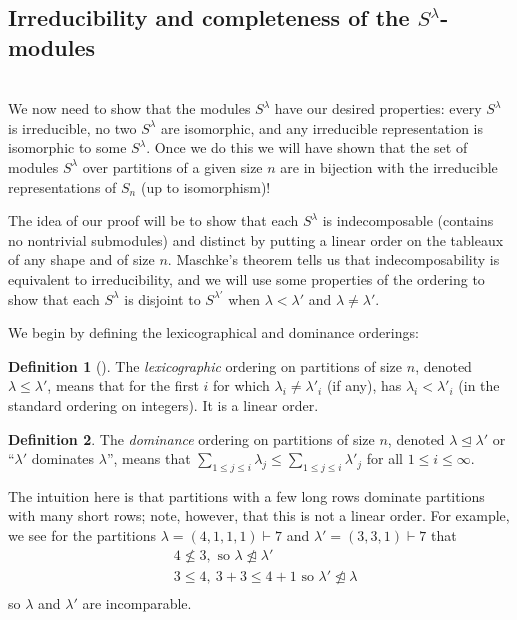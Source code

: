 \documentclass[12pt,twoside]{reedthesis}
\theoremstyle{plain}   %
\theoremstyle{definition}
\newtheorem{defn}{Definition}[section]
\theoremstyle{remark}
\numberwithin{equation}{section}
\def\normeq{\trianglelefteq}
\begin{document}
  \subsection{Irreducibility and completeness of the $S^\lambda$-modules} \hfill\\
  We now need to show that the modules $S^\lambda$ have our desired properties: every $S^\lambda$ is irreducible, no two $S^\lambda$ are isomorphic,
  and any irreducible representation is isomorphic to some $S^\lambda$. Once we do this we will have shown that the set of modules $S^\lambda$
  over partitions of a given size $n$
  are in bijection with the irreducible representations of $S_n$ (up to isomorphism)! \par
  The idea of our proof will be to show that each $S^\lambda$ is indecomposable (contains no nontrivial submodules)
  and distinct by putting a linear order on the tableaux of any shape
  and of size $n$. Maschke's theorem tells us that indecomposability is equivalent to irreducibility, and we will use some properties of the ordering
  to show that each $S^\lambda$ is disjoint to $S^{\lambda'}$ when $\lambda < \lambda'$ and $\lambda \neq \lambda'$.
  \par
  We begin by defining the lexicographical and dominance orderings:
  \begin{defn}[{\cite[pg. 36]{fulton}}]
    The \emph{lexicographic} ordering on partitions of size $n$, denoted $ \lambda \leq \lambda'$, means that
    for the first $i$ for which $\lambda_i \neq \lambda'_i$ (if any), has $\lambda_i < \lambda'_i$ (in the standard ordering on integers).
    It is a linear order.
  \end{defn}
  \begin{defn}
    The \emph{dominance} ordering on partitions of size $n$, denoted $ \lambda \normeq \lambda'$ or ``$\lambda'$ dominates $\lambda$'',
    means that $\sum_{1 \leq j \leq i} \lambda_j \leq \sum_{1 \leq j \leq i} \lambda'_j$ for all $ 1 \leq i \leq \infty$. \par
    The intuition here is that partitions with a few long rows dominate partitions with many short rows; note, however, that this is
    not a linear order. For example, we see for the partitions $\lambda = (4,1,1,1) \vdash 7$ and $\lambda' = (3,3,1) \vdash 7$ that
    \begin{align*}
      &4 \not \leq 3, \text{ so $\lambda \not \normeq \lambda'$}\\
      &3 \leq  4, \ 3 + 3 \leq 4 + 1  \text{ so $\lambda' \not \normeq \lambda$}\\
    \end{align*}
    so $\lambda$ and $\lambda'$ are incomparable.
  \end{defn}
\end{document}
